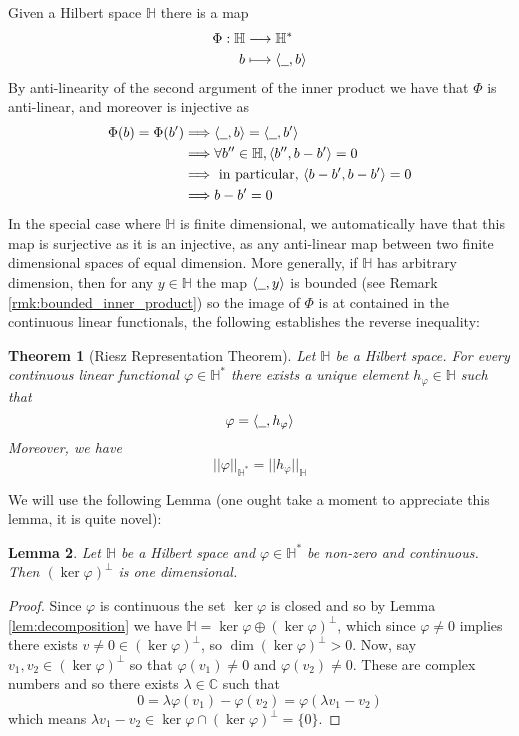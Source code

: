 \documentclass[12pt]{article}
\theoremstyle{plain}
\newtheorem{thm}{Theorem}[subsection] %
\newtheorem{lemma}[thm]{Lemma}
\theoremstyle{definition}
\newcommand{\bb}[1]{\mathbb{#1}}
\newcommand{\und}[1]{\underline{\hspace{#1 cm}}}
\newcommand{\lto}{\longrightarrow}
\begin{document}
Given a Hilbert space $\bb{H}$ there is a map
\begin{align}
    \Phi: \bb{H} &\lto \bb{H}^\ast\label{eq:Riesz_map}\\
    b &\longmapsto \langle \und{0.2}, b \rangle
\end{align}
By anti-linearity of the second argument of the inner product we have that $\Phi$ is anti-linear, and moreover is injective as
\begin{align*}
    \Phi(b) = \Phi(b') &\Longrightarrow \langle \und{0.2}, b\rangle = \langle \und{0.2}, b'\rangle\\
    &\Longrightarrow \forall b'' \in \bb{H}, \langle b'', b - b'\rangle = 0\\
    &\Longrightarrow \text{ in particular, } \langle b-b', b-b'\rangle = 0\\
    &\Longrightarrow b - b' = 0
\end{align*}
In the special case where $\bb{H}$ is finite dimensional, we automatically have that this map is surjective as it is an injective, as any anti-linear map between two finite dimensional spaces of equal dimension. More generally, if $\bb{H}$ has arbitrary dimension, then for any $y \in \bb{H}$ the map $\langle \und{0.2},y\rangle$ is bounded (see Remark \ref{rmk:bounded_inner_product}) so the image of $\Phi$ is at contained in the continuous linear functionals, the following establishes the reverse inequality:
\begin{thm}[Riesz Representation Theorem]\label{thm:riesz}
Let $\bb{H}$ be a Hilbert space. For every continuous linear functional $\varphi \in \bb{H}^\ast$ there exists a unique element $h_\varphi \in \bb{H}$ such that
\begin{equation}
    \varphi = \langle \und{0.2}, h_\varphi \rangle
\end{equation}
Moreover, we have
\begin{equation}
    ||\varphi||_{\bb{H}^\ast} = ||h_\varphi||_{\bb{H}}
\end{equation}
\end{thm}
We will use the following Lemma (one ought take a moment to appreciate this lemma, it is quite novel):
\begin{lemma}\label{lem:one_dim_kernel}
Let $\bb{H}$ be a Hilbert space and $\varphi \in \bb{H}^\ast$ be non-zero and continuous. Then $(\operatorname{ker}\varphi)^\perp$ is one dimensional.
\end{lemma}
\begin{proof}
Since $\varphi$ is continuous the set $\operatorname{ker}\varphi$ is closed and so by Lemma \ref{lem:decomposition} we have $\bb{H} = \operatorname{ker}\varphi \oplus (\operatorname{ker}\varphi)^\perp$, which since $\varphi\neq 0$ implies there exists $v\neq 0 \in (\operatorname{ker}\varphi)^\perp$, so $\operatorname{dim}(\operatorname{ker}\varphi)^\perp > 0$. Now, say $v_1,v_2 \in (\operatorname{ker}\varphi)^\perp$ so that $\varphi(v_1) \neq 0$ and $\varphi(v_2) \neq 0$. These are complex numbers and so there exists $\lambda \in \bb{C}$ such that
\[0 = \lambda \varphi(v_1) - \varphi(v_2) = \varphi(\lambda v_1 - v_2)\]
which means $\lambda v_1 - v_2 \in \operatorname{ker}\varphi \cap (\operatorname{ker}\varphi)^\perp = \lbrace 0 \rbrace$.
\end{proof}
\end{document}

